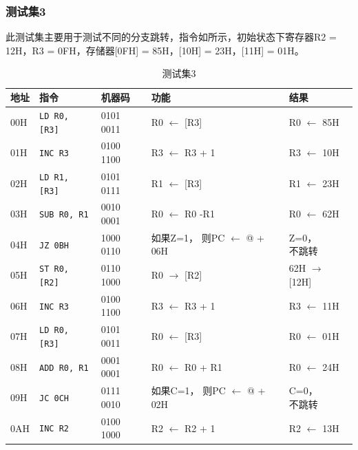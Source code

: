 \documentclass[lang=cn,11pt,a4paper,cite=authornum]{paper}
\begin{document}
\subsubsection{测试集3}

此测试集主要用于测试不同的分支跳转，指令如所示，初始状态下寄存器R2 = 12H，R3 = 0FH，存储器[0FH] = 85H，[10H] = 23H，[11H] = 01H。

\begin{table}[!htbp]
    \centering
    \caption{测试集3\label{tab:base_test_3}}
    \begin{tabular}{|l|l|l|l|l|}
        \hline 
        地址 & 指令 & 机器码  &  功能 & 结果 \\ \hline 
        00H & \texttt{LD R0, [R3]} & 0101 0011  &  R0 $\leftarrow$ [R3]  & R0 $\leftarrow$ 85H \\ \hline 
        01H & \texttt{INC R3} & 0100 1100  &  R3 $\leftarrow$ R3 + 1 & R3 $\leftarrow$ 10H \\ \hline 
        02H & \texttt{LD R1, [R3]} & 0101 0111  &  R1 $\leftarrow$ [R3]  & R1 $\leftarrow$ 23H \\ \hline 
        03H & \texttt{SUB R0, R1} & 0010 0001  &  R0 $\leftarrow$ R0 -R1 & R0 $\leftarrow$ 62H \\ \hline 
        04H & \texttt{JZ 0BH} & 1000 0110  &  \makecell[l]{如果Z=1，\\则PC $\leftarrow$ @ + 06H} & \makecell[l]{Z=0，\\不跳转} \\ \hline 
        05H & \texttt{ST R0, [R2]} & 0110 1000  &  R0 $\rightarrow$ [R2] & 62H $\rightarrow$ [12H]  \\ \hline 
        06H & \texttt{INC R3} & 0100 1100  &  R3 $\leftarrow$ R3 + 1 & R3 $\leftarrow$ 11H \\ \hline 
        07H & \texttt{LD R0, [R3]} & 0101 0011  &  R0 $\leftarrow$ [R3]  & R0 $\leftarrow$ 01H \\ \hline 
        08H & \texttt{ADD R0, R1} & 0001 0001  &  R0 $\leftarrow$ R0 + R1 & R0 $\leftarrow$ 24H \\ \hline 
        09H & \texttt{JC 0CH} & 0111 0010  &  \makecell[l]{如果C=1，\\则PC $\leftarrow$ @ + 02H} & \makecell[l]{C=0，\\不跳转} \\ \hline 
        0AH & \texttt{INC R2} & 0100 1000  &  R2 $\leftarrow$ R2 + 1 & R2 $\leftarrow$ 13H \\ \hline 

\end{tabular}
\end{table}
\end{document}

